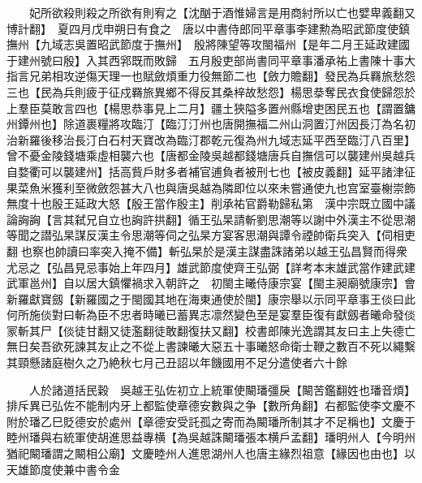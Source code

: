 　　妃所欲殺則殺之所欲有則宥之【沈酗于酒惟婦言是用商紂所以亡也嬖卑義翻又博計翻】　夏四月戊申朔日有食之　唐以中書侍郎同平章事李建勲為昭武節度使鎮撫州【九域志吳置昭武節度于撫州】　殷將陳望等攻閩福州【是年二月王延政建國于建州號曰殷】入其西郛既而敗歸　五月殷吏部尚書同平章事潘承祐上書陳十事大指言兄弟相攻逆傷天理一也賦斂煩重力役無節二也【斂力贍翻】發民為兵羇旅愁怨三也【民為兵則疲于征戍羇旅異鄉不得反其桑梓故愁怨】楊思㳟奪民衣食使歸怨於上羣臣莫敢言四也【楊思恭事見上二月】疆土狹隘多置州縣增吏困民五也【謂置鏞州鐔州也】除道裹糧將攻臨汀【臨汀汀州也唐開撫福二州山洞置汀州因長汀為名初治新羅後移治長汀白石村天寶改為臨汀郡乾元復為州九域志延平西至臨汀八百里】曾不憂金陵錢塘乘虛相襲六也【唐都金陵吳越都錢塘唐兵自撫信可以襲建州吳越兵自婺衢可以襲建州】括高貲戶財多者補官逋負者被刑七也【被皮義翻】延平諸津征果菜魚米獲利至微斂怨甚大八也與唐吳越為隣即位以來未嘗通使九也宫室臺榭崇飾無度十也殷王延政大怒【殷王當作殷主】削承祐官爵勒歸私第　漢中宗既立國中議論詾詾【言其弑兄自立也詾許拱翻】循王弘杲請斬劉思潮等以謝中外漢主不從思潮等聞之譛弘杲謀反漢主令思潮等伺之弘杲方宴客思潮與譚令禋帥衛兵突入【伺相吏翻也察也帥讀曰率突入掩不備】斬弘杲於是漢主謀盡誅諸弟以越王弘昌賢而得衆尤忌之【弘昌見忌事始上年四月】雄武節度使齊王弘弼【詳考本末雄武當作建武建武軍邕州】自以居大鎮懼禍求入朝許之　初閩主曦侍康宗宴【閩主昶廟號康宗】會新羅獻寶劔【新羅國之于閩國其地在海東通使於閩】康宗舉以示同平章事王倓曰此何所施倓對曰斬為臣不忠者時曦已蓄異志凛然變色至是宴羣臣復有獻劔者曦命發倓冡斬其尸【倓徒甘翻又徒濫翻徒敢翻復扶又翻】校書郎陳光逸謂其友曰主上失德亡無日矣吾欲死諫其友止之不從上書諫曦大惡五十事曦怒命衛士鞭之數百不死以繩繫其頸懸諸庭樹久之乃絶秋七月己丑詔以年饑國用不足分遣使者六十餘

　　人於諸道括民穀　吳越王弘佐初立上統軍使闞璠彊戾【闞苦鑑翻姓也璠音煩】排斥異已弘佐不能制内牙上都監使章德安數與之争【數所角翻】右都監使李文慶不附於璠乙巳貶德安於處州【章德安受託孤之寄而為闞璠所制其才不足稱也】文慶于睦州璠與右統軍使胡進思益專横【為吳越誅闞璠張本横戶孟翻】璠明州人【今明州猶祀闞璠謂之闞相公廟】文慶睦州人進思湖州人也唐主緣烈祖意【緣因也由也】以天雄節度使兼中書令金


